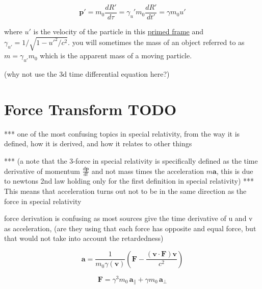 \begin{equation}
	\mathbf{p'} = m_0 \frac{dR'}{d\tau}= \gamma_u' m_0 \frac{dR'}{dt'} = \gamma m_0 u'
\end{equation}

where $u'$ is the velocity of the particle in this \hyperlink{def-Primed-Frame}{primed frame} and $\gamma_{u'}= 1/\sqrt{1-u'^2/c^2}$. you will sometimes the mass of an object referred to as $m=\gamma_{u'} m_0$ which is the apparent mass of a moving particle.

(why not use the 3d time differential equation here?)

\section{Force Transform TODO}

*** one of the most confusing topics in special relativity, from the way it is defined, how it is derived, and how it relates to other things\newline

*** (a note that the 3-force in special relativity is specifically defined as the time derivative of momentum $\frac{d\mathbf{p}}{dt}$ and not mass times the acceleration $m\mathbf{a}$, this is due to newtons 2nd law holding only for the first definition in special relativity) \newline
*** This means that acceleration turns out not to be in the same direction as the force in special relativity\newline

force derivation is confusing as most sources give the time derivative of u and v as acceleration, (are they using that each force has opposite and equal force, but that would not take into account the retardedness)

\begin{equation}
	\mathbf{a} = \frac{1}{m_0 \gamma(\mathbf{v})} \left( \mathbf{F} - \frac{ ( \mathbf{v} \cdot \mathbf{F} ) \mathbf{v} }{c^2} \right)
\end{equation}

\begin{equation}
	\mathbf{F} = \gamma^3 m_0 \, \mathbf{a}_\parallel + \gamma m_0 \, \mathbf{a}_\perp
\end{equation}

